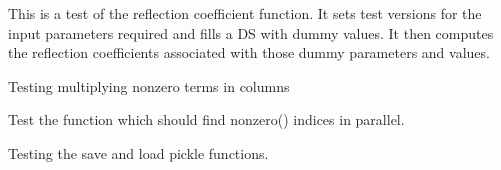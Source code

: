 \documentclass[letterpaper,10pt,english]{sphinxmanual}
\begin{document}
\begin{fulllineitems}
\label{\detokenize{index:DictionarySparseMatrix.test_14}}
This is a test of the reflection coefficient function.
It sets test versions for the input parameters required and fills a DS   with dummy values.
It then computes the reflection coefficients associated with those   dummy parameters and values.

\end{fulllineitems}


\begin{fulllineitems}
\label{\detokenize{index:DictionarySparseMatrix.test_15}}
Testing multiplying nonzero terms in columns

\end{fulllineitems}


\begin{fulllineitems}
\label{\detokenize{index:DictionarySparseMatrix.test_17}}
Test the {\hyperref[\detokenize{index:DictionarySparseMatrix.parnonzero}]{}} function which should find   nonzero() indices in parallel.

\end{fulllineitems}


\begin{fulllineitems}
\label{\detokenize{index:DictionarySparseMatrix.test_18}}
Testing the save and load pickle functions.

\end{fulllineitems}

\end{document}
